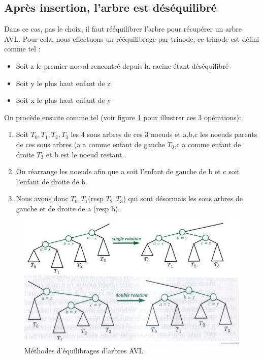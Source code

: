 \documentclass[10pt,a4paper]{article}
\begin{document}
\subsection*{Après insertion, l'arbre est déséquilibré}
Dans ce cas, pas le choix, il faut rééquilibrer l'arbre pour récupérer un arbre AVL. Pour cela, nous effectuons un rééquilibrage par trinode, ce trinode est défini comme tel :
\begin{itemize}
\item Soit z le premier noeud rencontré depuis la racine étant déséquilibré
\item Soit y le plus haut enfant de z
\item Soit x le plus haut enfant de y
\end{itemize}
On procède ensuite comme tel (voir figure \ref{avleq} pour illustrer ces 3 opérations):
\begin{enumerate}

\item Soit $T_0,T_1,T_2,T_3$ les 4 sous arbres de ces 3 noeuds et a,b,c les noeuds parents de ces sous arbres (a a comme enfant de gauche $T_0$,c a comme enfant de droite $T_3$ et b est le noeud restant.
\item On réarrange les noeuds afin que a soit l'enfant de gauche de b et c soit l'enfant de droite de b.
\item Nous avons donc $T_0,T_1$(resp $T_2,T_3$) qui sont désormais les sous arbres de gauche et de droite de a (resp b).
\end{enumerate}
\begin{figure}[!h]
\centering
\includegraphics[scale=0.7]{equilibrage.jpg}
\caption{Méthodes d'équilibrages d'arbres AVL}
\label{avleq}
\end{figure}
\end{document}
